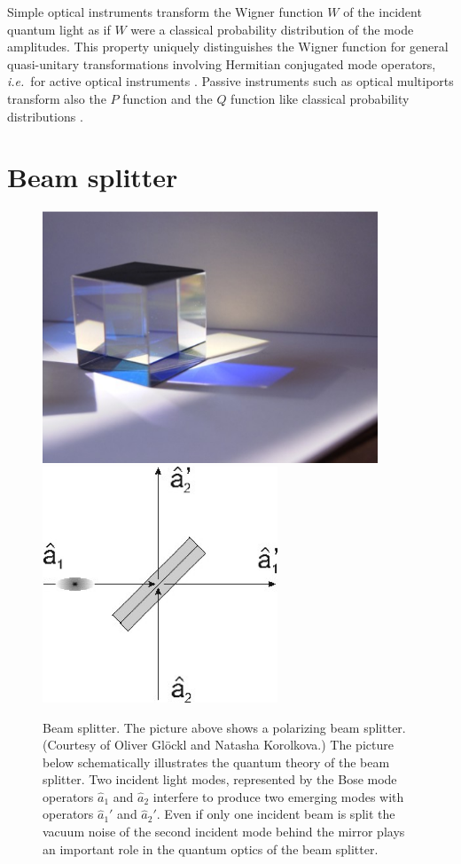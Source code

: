 \documentclass[12pt,amsmath,amssymb]{article}
\numberwithin{equation}{section}
\begin{document}
Simple optical instruments transform the Wigner function $W$ of
the incident quantum light as if $W$ were a classical probability
distribution of the mode amplitudes. This property uniquely
distinguishes \cite{EkertKnight} the Wigner function for general
quasi-unitary transformations involving Hermitian conjugated mode
operators, {\it i.e.}\ for active optical instruments
\cite{LeoSU11}. Passive instruments such as optical multiports
\cite{Reck,Torma1,Torma3} transform also the $P$ function and the
$Q$ function like classical probability distributions
\cite{LeoSU2}.

\section{Beam splitter}

\begin{figure}
\begin{center}
\includegraphics[width=10cm]{fig1a.eps}\vspace*{1cm}
\includegraphics[width=7cm]{fig1b.eps}
\end{center}
\caption{\label{fig:beamsplitter}Beam splitter.
The picture above shows a polarizing beam splitter.
(Courtesy of Oliver Gl\"ockl and Natasha Korolkova.)
The picture below schematically illustrates
the quantum theory of the beam splitter.
Two incident light modes, represented by the
Bose mode operators $\hat{a}_1$ and $\hat{a}_2$
interfere to produce two emerging modes
with operators $\hat{a}_1'$ and $\hat{a}_2'$.
Even if only one incident beam is split
the vacuum noise of the second incident
mode behind the mirror plays an important
role in the quantum optics of the beam splitter.}
\end{figure}
\end{document}
